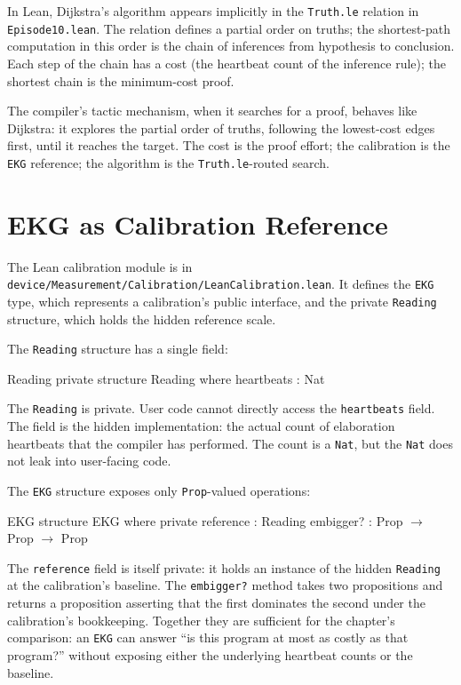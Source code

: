 In Lean, Dijkstra's algorithm appears implicitly in the
\texttt{Truth.le} relation in \texttt{Episode10.lean}. The
relation defines a partial order on truths; the shortest-path
computation in this order is the chain of inferences from
hypothesis to conclusion. Each step of the chain has a cost (the
heartbeat count of the inference rule); the shortest chain is
the minimum-cost proof.

The compiler's tactic mechanism, when it searches for a proof,
behaves like Dijkstra: it explores the partial order of truths,
following the lowest-cost edges first, until it reaches the
target. The cost is the proof effort; the calibration is the
\texttt{EKG} reference; the algorithm is the
\texttt{Truth.le}-routed search.

\section{EKG as Calibration Reference}
\label{se:ekg-as-calibration-reference}

The Lean calibration module is in
\texttt{device/Measurement/Calibration/LeanCalibration.lean}. It
defines the \texttt{EKG} type, which represents a calibration's
public interface, and the private \texttt{Reading} structure, which
holds the hidden reference scale.

The \texttt{Reading} structure has a single field:

\begin{leanexcerpt}{Reading}
private structure Reading where
  heartbeats : Nat
\end{leanexcerpt}

The \texttt{Reading} is private. User code cannot directly access
the \texttt{heartbeats} field. The field is the hidden
implementation: the actual count of elaboration heartbeats that
the compiler has performed. The count is a \texttt{Nat}, but the
\texttt{Nat} does not leak into user-facing code.

The \texttt{EKG} structure exposes only \texttt{Prop}-valued
operations:

\begin{leanexcerpt}{EKG}
structure EKG where
  private reference : Reading
  embigger? : Prop $\to$ Prop $\to$ Prop
\end{leanexcerpt}

The \texttt{reference} field is itself private: it holds an
instance of the hidden \texttt{Reading} at the calibration's
baseline. The \texttt{embigger?} method takes two propositions
and returns a proposition asserting that the first dominates the
second under the calibration's bookkeeping. Together they are
sufficient for the chapter's comparison: an \texttt{EKG} can
answer ``is this program at most as costly as that program?''
without exposing either the underlying heartbeat counts or the
baseline.

